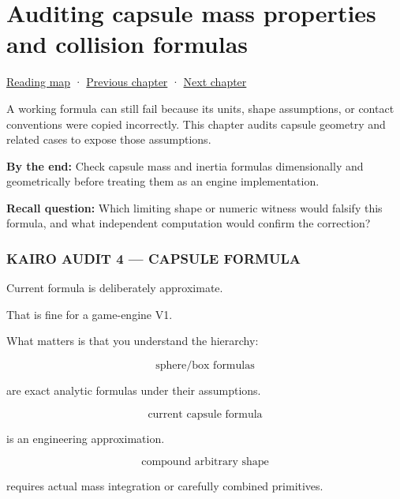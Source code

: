 \chapter{Auditing capsule mass properties and collision formulas}\label{06-engine-ii-ch036-auditing-capsule-mass-properties-and-collision-formulas}\hypertarget{06-engine-ii-ch036}{}\label{stagechapter:06-engine-ii-ch036}

\hypertarget{06-engine-ii-ch036-auditing-capsule-mass-properties-and-collision-formulas}{}

\hyperref[volume-reading-map]{Reading map} · \hyperref[06-engine-ii-ch035-a-complete-rigid-body-state-before-the-formula-audit]{Previous chapter} · \hyperref[06-engine-ii-ch037-physical-examples-and-state-validation]{Next chapter}

A working formula can still fail because its units, shape assumptions, or contact conventions were copied incorrectly. This chapter audits capsule geometry and related cases to expose those assumptions.

\textbf{By the end:} Check capsule mass and inertia formulas dimensionally and geometrically before treating them as an engine implementation.

\textbf{Recall question:} Which limiting shape or numeric witness would falsify this formula, and what independent computation would confirm the correction?

\subsection{KAIRO AUDIT 4 --- CAPSULE FORMULA}\label{06-engine-ii-ch036-kairo-audit-4-capsule-formula}

\hypertarget{06-engine-ii-ch036-kairo-audit-4-capsule-formula}{}

Current formula is deliberately approximate.

That is fine for a game-engine V1.

What matters is that you understand the hierarchy:

\[
\text{sphere/box formulas}
\]

are exact analytic formulas under their assumptions.

\[
\text{current capsule formula}
\]

is an engineering approximation.

\[
\text{compound arbitrary shape}
\]

requires actual mass integration or carefully combined primitives.


